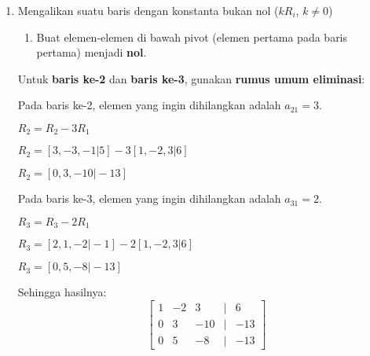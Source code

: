 \documentclass{article}
\begin{document}
\begin{enumerate}
\begin{enumerate}
        \item Mengalikan suatu baris dengan konstanta bukan nol (\(kR_i\), \(k \neq 0\))
        
        \begin{enumerate}
            \item Buat elemen-elemen di bawah pivot (elemen pertama pada baris pertama) menjadi \textbf{nol}.

        \end{enumerate}

        \vspace{1em}

        Untuk \textbf{baris ke-2} dan \textbf{baris ke-3}, gunakan \textbf{rumus umum eliminasi}:

        \vspace{1em}

        Pada baris ke-2, elemen yang ingin dihilangkan adalah \( a_{21} = 3 \).

        \(R_2 = R_2 - 3R_1\)

        \(R_2 = [3, -3, -1 \vert 5] - 3[1, -2, 3 \vert 6]\)

        \(R_2 = [0, 3, -10 \vert -13]\)

        \vspace{1em}
        
        Pada baris ke-3, elemen yang ingin dihilangkan adalah \( a_{31} = 2 \).

        \(R_3 = R_3 - 2R_1\)

        \(R_3 = [2, 1, -2 \vert -1] - 2[1, -2, 3 \vert 6]\)

        \(R_3 = [0, 5, -8 \vert -13]\)

        Sehingga hasilnya:
        \[
        \begin{bmatrix}
        1 & -2 & 3 & \vert & 6 \\
        0 & 3 & -10 & \vert & -13 \\
        0 & 5 & -8 & \vert & -13
        \end{bmatrix}
        \]

        \vspace{1em}
    \end{enumerate}
\end{enumerate}
\end{document}
